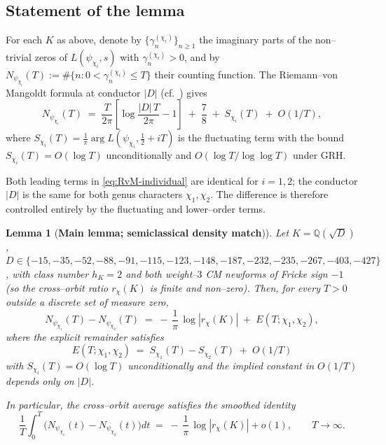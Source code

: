 \documentclass[11pt]{amsart}
\newtheorem{lemma}[theorem]{Lemma}
\theoremstyle{definition}
\theoremstyle{remark}
\newcommand{\Q}{\mathbb{Q}}
\begin{document}
\subsection{Statement of the lemma}\label{ssec:statement-intro}
For each \(K\) as above, denote by
\(\{\gamma_n^{(\chi_i)}\}_{n \ge 1}\) the imaginary parts of the
non--trivial zeros of \(L(\psi_{\chi_i}, s)\) with
\(\gamma_n^{(\chi_i)} > 0\), and by
\(N_{\psi_{\chi_i}}(T) := \#\{n : 0 < \gamma_n^{(\chi_i)} \le T\}\)
their counting function. The Riemann--von Mangoldt formula at conductor
\(|D|\) (cf.\ \cite[Ch.~10]{IwaniecKowalski2004}) gives
\begin{equation}\label{eq:RvM-individual}
  N_{\psi_{\chi_i}}(T)
   \;=\;
   \frac{T}{2\pi}\!\left[ \log\frac{|D|\,T}{2\pi} - 1 \right]
   \;+\;
   \frac{7}{8} \;+\; S_{\chi_i}(T) \;+\; O(1/T),
\end{equation}
where \(S_{\chi_i}(T) = \tfrac{1}{\pi} \arg L(\psi_{\chi_i},
\tfrac{1}{2} + i T)\) is the fluctuating term with the bound
\(S_{\chi_i}(T) = O(\log T)\) unconditionally and \(O(\log T / \log\log T)\)
under GRH.

Both leading terms in \eqref{eq:RvM-individual} are identical for
\(i = 1, 2\); the conductor \(|D|\) is the same for both genus
characters \(\chi_1, \chi_2\). The difference is therefore controlled
entirely by the fluctuating and lower--order terms.

\begin{lemma}[\textbf{Main lemma; semiclassical density match})]
\label{lem:main}
Let \(K = \Q(\sqrt D)\), \(D \in \{-15, -35, -52, -88, -91, -115, -123,
-148, -187, -232, -235, -267, -403, -427\}\), with class number
\(h_K = 2\) and both weight--\(3\) CM newforms of Fricke sign \(-1\)
(so the cross--orbit ratio \(r_\chi(K)\) is finite and non--zero).
Then, for every \(T > 0\) outside a discrete set of measure zero,
\begin{equation}\label{eq:main}
  \boxed{\;
   N_{\psi_{\chi_1}}(T) - N_{\psi_{\chi_2}}(T)
   \;=\;
   -\,\frac{1}{\pi}\, \log |r_\chi(K)|
   \;+\;
   E(T; \chi_1, \chi_2),
   \;}
\end{equation}
where the explicit remainder satisfies
\begin{equation}\label{eq:E-bound}
  E(T; \chi_1, \chi_2)
  \;=\;
  S_{\chi_1}(T) - S_{\chi_2}(T) \;+\; O(1/T)
\end{equation}
with \(S_{\chi_i}(T) = O(\log T)\) unconditionally and the implied
constant in \(O(1/T)\) depends only on \(|D|\).

In particular, the cross--orbit average satisfies the smoothed identity
\begin{equation}\label{eq:smoothed}
  \frac{1}{T}\int_0^T \bigl(N_{\psi_{\chi_1}}(t) - N_{\psi_{\chi_2}}(t)\bigr) dt
  \;=\;
  -\,\frac{1}{\pi}\, \log |r_\chi(K)| + o(1),
  \qquad T \to \infty .
\end{equation}
\end{lemma}
\end{document}
